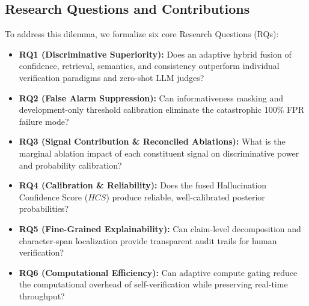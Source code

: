 \documentclass[conference]{IEEEtran}
\begin{document}
\subsection{Research Questions and Contributions}
To address this dilemma, we formalize six core Research Questions (RQs):
\begin{itemize}
    \item \textbf{RQ1 (Discriminative Superiority):} Does an adaptive hybrid fusion of confidence, retrieval, semantics, and consistency outperform individual verification paradigms and zero-shot LLM judges?
    \item \textbf{RQ2 (False Alarm Suppression):} Can informativeness masking and development-only threshold calibration eliminate the catastrophic 100\% FPR failure mode?
    \item \textbf{RQ3 (Signal Contribution \& Reconciled Ablations):} What is the marginal ablation impact of each constituent signal on discriminative power and probability calibration?
    \item \textbf{RQ4 (Calibration \& Reliability):} Does the fused Hallucination Confidence Score ($HCS$) produce reliable, well-calibrated posterior probabilities?
    \item \textbf{RQ5 (Fine-Grained Explainability):} Can claim-level decomposition and character-span localization provide transparent audit trails for human verification?
    \item \textbf{RQ6 (Computational Efficiency):} Can adaptive compute gating reduce the computational overhead of self-verification while preserving real-time throughput?
\end{itemize}
\end{document}
